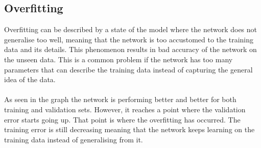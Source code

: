 \subsection{Overfitting}\label{sec:overfitting}
Overfitting can be described by a state of the model where the network does not generalise too well, meaning that the network is too accustomed to the training data and its details. This phenomenon results in bad accuracy of the network on the unseen data. This is a common problem if the network has too many parameters that can describe the training data instead of capturing the general idea of the data. \\
 \\
As seen in the graph the network is performing better and better for both training and validation sets. However, it reaches a point where the validation error starts going up. That point is where the overfitting has occurred. The training error is still decreasing meaning that the network keeps learning on the training data instead of generalising from it. 

